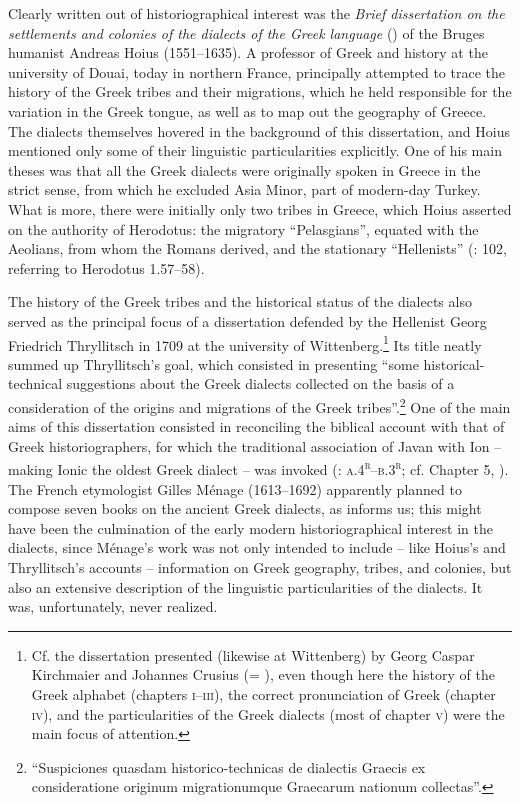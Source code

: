 Clearly written out of historiographical interest was the \textit{Brief dissertation on the settlements and colonies of the dialects of the Greek language} (\citeyear{Hoius1620}) of the Bruges humanist Andreas Hoius (1551–1635). A professor of Greek and history at the university of Douai, today in northern France, \citet[95]{Hoius1620} principally attempted to trace the history of the Greek tribes and their migrations, which he held responsible for the variation in the Greek tongue, as well as to map out the geography of Greece. The dialects themselves hovered in the background of this dissertation, and Hoius mentioned only some of their linguistic particularities explicitly. One of his main theses was that all the Greek dialects were originally spoken in Greece in the strict sense, from which he excluded Asia Minor, part of modern-day Turkey.\textsuperscript{} What is more, there were initially only two tribes in Greece, which Hoius asserted on the authority of Herodotus: the migratory “Pelasgians”, equated with the Aeolians, from whom the Romans derived, and the stationary “Hellenists” (\citealt{Hoius1620}: 102, referring to Herodotus 1.57–58).

The history of the Greek tribes and the historical status of the dialects also served as the principal focus of a dissertation defended by the Hellenist Georg Friedrich Thryllitsch in 1709 at the university of Wittenberg.\footnote{Cf. the dissertation presented (likewise at Wittenberg) by Georg Caspar Kirchmaier and Johannes Crusius (= \citealt{KirchmaierCrusius1684}), even though here the history of the Greek alphabet (chapters \textsc{i}{}--\textsc{iii}), the correct pronunciation of Greek (chapter \textsc{iv}), and the particularities of the Greek dialects (most of chapter \textsc{v}) were the main focus of attention.} Its title neatly summed up Thryllitsch’s goal, which consisted in presenting “some historical-technical suggestions about the Greek dialects collected on the basis of a consideration of the origins and migrations of the Greek tribes”.\footnote{“Suspiciones quasdam historico-technicas de dialectis Graecis ex consideratione originum migrationumque Graecarum nationum collectas”.} One of the main aims of this dissertation consisted in reconciling the biblical account with that of Greek historiographers, for which the traditional association of Javan with Ion – making Ionic the oldest Greek dialect – was invoked (\citealt{Thryllitsch1709}: \textsc{a.4}\textsc{\textsuperscript{r}}\textsc{–b.3}\textsc{\textsuperscript{r}}; cf. Chapter 5, ). The French etymologist Gilles Ménage (1613–1692) apparently planned to compose seven books on the ancient Greek dialects, as \citet[252]{Leibniz1991} informs us; this might have been the culmination of the early modern historiographical interest in the dialects, since Ménage’s work was not only intended to include – like Hoius’s and Thryllitsch’s accounts – information on Greek geography, tribes, and colonies, but also an extensive description of the linguistic particularities of the dialects. It was, unfortunately, never realized.

